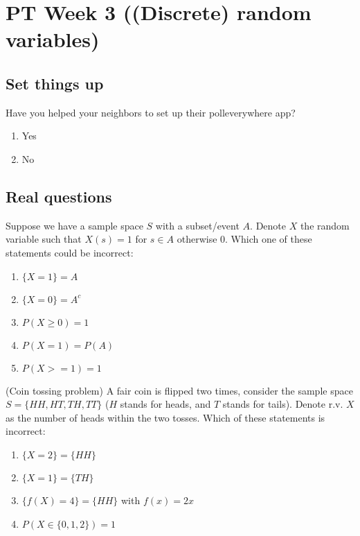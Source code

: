 \documentclass[poll_tutorial_format]{subfiles}
\begin{document}
	\maketitle
		\setcounter{section}{2}
	\section{PT Week 3 ((Discrete) random variables)}
	
	\subsection{Set things up}
	\label{sec:set-things-up}
	
	
	
	\setcounter{theorem}{-1}
	
	\begin{exercise}
		Have you helped your neighbors to set up their polleverywhere app? 
		\begin{enumerate}
			\item Yes
			\item No
		\end{enumerate}
	\end{exercise}
	
	\subsection{Real questions}
	\label{sec:start-real-questions pt week 3}
	\begin{exercise}
		Suppose we have a sample space $S$ with a subset/event $A$. Denote $X$ the random variable such that $X(s)=1$ for $s\in A$ otherwise $0$. 
		Which one of these statements could be incorrect:
		\begin{enumerate}
			\item $\{X=1\}=A$
			\item $\{X=0\}=A^c$
			\item $P(X\geq 0)=1$
			\item $P(X=1)=P(A)$
			\item $P(X>=1)=1$ 
		\end{enumerate}
	\end{exercise}


	\begin{exercise}
	(Coin tossing problem) A fair coin is flipped two times, consider the sample space $S=\{HH, HT, TH, TT\}$ ($H$ stands for heads, and $T$ stands for tails). Denote r.v. $X$ as the number of heads within the two tosses.
	Which of these statements is incorrect: 
	\begin{enumerate}
		\item $\{X=2\}=\{HH\}$
		\item $ \{X=1\}=\{TH\}$
		\item $\{f(X) =4\} =\{HH\} $ with $f(x)=2x$
		\item $ P(X\in \{0,1,2\}) =1$
	\end{enumerate}
\end{exercise}
\end{document}
